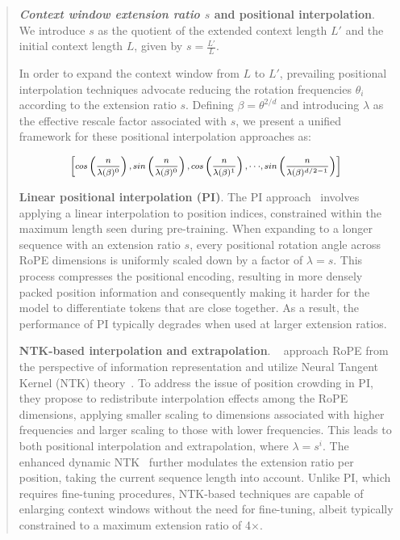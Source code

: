 \begin{abstract}
\textbf{\emph{Context window extension ratio $s$} and positional interpolation}. We introduce $s$ as the quotient of the extended context length $L'$ and the initial context length $L$, given by $s=\frac{L'}{L}$.

In order to expand the context window from $L$ to $L'$, prevailing positional interpolation techniques advocate reducing the rotation frequencies $\theta_i$ according to the extension ratio $s$. Defining $\beta = \theta^{2/d}$ and introducing $\lambda$ as the effective rescale factor associated with $s$, we present a unified framework for these positional interpolation approaches as:

\begin{equation}	
	\fontsize{7.5}{7.5} \selectfont
	\label{eq:unified_rope}
	\begin{aligned}
		\left[cos\left(\frac{n}{\lambda(\beta)^0}\right), sin \left(\frac{n}{\lambda(\beta)^0}\right), cos\left(\frac{n}{\lambda(\beta)^1}\right), \cdot\cdot\cdot,  sin \left(\frac{n}{\lambda(\beta)^{d/2-1}}\right) \right]   
	\end{aligned}
\end{equation}

\textbf{Linear positional interpolation (PI)}. The PI approach~\cite{pi} involves applying a linear interpolation to position indices, constrained within the maximum length seen during pre-training. When expanding to a longer sequence with an extension ratio $s$, every positional rotation angle across RoPE dimensions is uniformly scaled down by a factor of $\lambda=s$. This process compresses the positional encoding, resulting in more densely packed position information and consequently making it harder for the model to differentiate tokens that are close together. As a result, the performance of PI typically degrades when used at larger extension ratios.

\textbf{NTK-based interpolation and extrapolation}. ~\cite{ntk,dynamicntk} approach RoPE from the perspective of information representation and utilize Neural Tangent Kernel (NTK) theory~\cite{jacot2018neural,tancik2020fourier}. To address the issue of position crowding in PI, they propose to redistribute interpolation effects among the RoPE dimensions, applying smaller scaling to dimensions associated with higher frequencies and larger scaling to those with lower frequencies. This leads to both positional interpolation and extrapolation, where $\lambda=s^{i}$. The enhanced dynamic NTK~\cite{dynamicntk} further modulates the extension ratio per position, taking the current sequence length into account. Unlike PI, which requires fine-tuning procedures, NTK-based techniques are capable of enlarging context windows without the need for fine-tuning, albeit typically constrained to a maximum extension ratio of 4$\times$.


\end{abstract}
